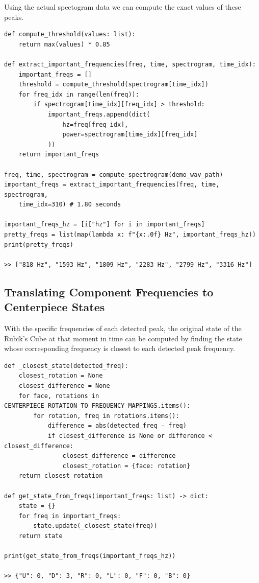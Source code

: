 Using the actual spectogram data we can compute the exact values of these peaks.
\begin{verbatim}
def compute_threshold(values: list):
    return max(values) * 0.85

def extract_important_frequencies(freq, time, spectrogram, time_idx):
    important_freqs = []
    threshold = compute_threshold(spectrogram[time_idx])
    for freq_idx in range(len(freq)):
        if spectrogram[time_idx][freq_idx] > threshold:
            important_freqs.append(dict(
                hz=freq[freq_idx],
                power=spectrogram[time_idx][freq_idx]
            ))
    return important_freqs

freq, time, spectrogram = compute_spectrogram(demo_wav_path)
important_freqs = extract_important_frequencies(freq, time, spectrogram,
    time_idx=310) # 1.80 seconds

important_freqs_hz = [i["hz"] for i in important_freqs]
pretty_freqs = list(map(lambda x: f"{x:.0f} Hz", important_freqs_hz))
print(pretty_freqs)

>> ["818 Hz", "1593 Hz", "1809 Hz", "2283 Hz", "2799 Hz", "3316 Hz"]
\end{verbatim}

\newpage
\subsection{Translating Component Frequencies to Centerpiece States}
\label{subsec:translating-freqs-to-state}
With the specific frequencies of each detected peak, the original state of the Rubik's Cube at that moment in time can be computed by finding the state whose corresponding frequency is closest to each detected peak frequency.

\begin{verbatim}
def _closest_state(detected_freq):
    closest_rotation = None
    closest_difference = None
    for face, rotations in CENTERPIECE_ROTATION_TO_FREQUENCY_MAPPINGS.items():
        for rotation, freq in rotations.items():
            difference = abs(detected_freq - freq)
            if closest_difference is None or difference < closest_difference:
                closest_difference = difference
                closest_rotation = {face: rotation}
    return closest_rotation

def get_state_from_freqs(important_freqs: list) -> dict:
    state = {}
    for freq in important_freqs:
        state.update(_closest_state(freq))
    return state

print(get_state_from_freqs(important_freqs_hz))

>> {"U": 0, "D": 3, "R": 0, "L": 0, "F": 0, "B": 0}
\end{verbatim}

